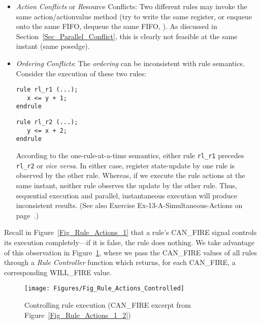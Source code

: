 \begin{itemize}

 \item \emph{Action Conflicts} or {\emph Resource Conflicts}: Two
       different rules may invoke the same action/actionvalue method
       (try to write the same register, or enqueue onto the same FIFO,
       dequeue the same FIFO, {\etc}).  As discussed in
       Section~\ref{Sec_Parallel_Conflict}, this is clearly not
       feasible at the same instant (same posedge).

 \item \emph{Ordering Conflicts}: The \emph{ordering} can be
       inconsistent with rule semantics.  Consider the execution of
       these two rules:

       \begin{center}
       \begin{minipage}{2.5in}
        {\footnotesize
        \begin{Verbatim}[frame=single, label=BSV]
rule rl_r1 (...);
   x <= y + 1;
endrule
        \end{Verbatim}
        }
       \end{minipage}
       \hmm
       \begin{minipage}{2.5in}
        {\footnotesize
        \begin{Verbatim}[frame=single,label=BSV]
rule rl_r2 (...);
   y <= x + 2;
endrule
        \end{Verbatim}
        }
       \end{minipage}
       \end{center}

       According to the one-rule-at-a-time semantics, either rule
       \verb|rl_r1| precedes \verb|rl_r2| or \emph{vice versa}.  In
       either case, register state-update by one rule is observed by
       the other rule.  Whereas, if we execute the rule actions at the
       same instant, neither rule observes the update by the other
       rule.  Thus, sequential execution and parallel, instantaneous
       execution will produce inconsistent results. (See also Exercise
       Ex-13-A-Simultaneous-Actions on
       page~\pageref{Ex-13-A-Simultaneous-Actions}.)

\end{itemize}

Recall in Figure~\ref{Fig_Rule_Actions_1} that a rule's CAN\_FIRE
signal controls its execution completely---if it is false, the rule
does nothing.  We take advantage of this observation in
Figure~\ref{Fig_Rule_Actions_Controlled}, where we pass the CAN\_FIRE
values of all rules through a \emph{Rule Controller} function which
returns, for each CAN\_FIRE, a corresponding WILL\_FIRE value.
\begin{figure}[htbp]
  \centerline{\texttt{[image: Figures/Fig\_Rule\_Actions\_Controlled]}}
  \caption{\label{Fig_Rule_Actions_Controlled}
           Controlling rule execution
	   (CAN\_FIRE excerpt from Figure~\ref{Fig_Rule_Actions_1_2})}
\end{figure}

